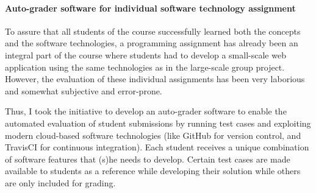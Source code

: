 


\paragraph{Auto-grader software for individual software technology assignment}
To assure that all students of the course successfully learned both the concepts and the software technologies, a programming assignment has already been an integral part of the course where students had to develop a small-scale web application using the same technologies as in the large-scale group project. However, the evaluation of these individual assignments has been very laborious and somewhat subjective and error-prone. 


Thus, I took the initiative to develop an auto-grader software to enable the automated evaluation of student submissions by running test cases and exploiting modern cloud-based software technologies (like GitHub for version control, and TravisCI for continuous integration). Each student receives a unique combination of software features that (s)he needs to develop. Certain test cases are made available to students as a reference while developing their solution while others are only included for grading. 

